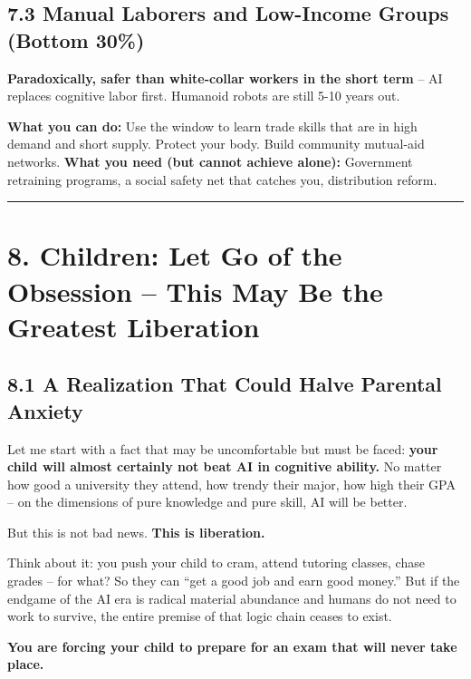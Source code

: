 \subsection{7.3 Manual Laborers and Low-Income Groups (Bottom
30\%)}\label{manual-laborers-and-low-income-groups-bottom-30}

\textbf{Paradoxically, safer than white-collar workers in the short
term} -- AI replaces cognitive labor first. Humanoid robots are still
5-10 years out.

\textbf{What you can do:} Use the window to learn trade skills that are
in high demand and short supply. Protect your body. Build community
mutual-aid networks. \textbf{What you need (but cannot achieve alone):}
Government retraining programs, a social safety net that catches you,
distribution reform.

\begin{center}\rule{0.5\linewidth}{0.5pt}\end{center}

\section{8. Children: Let Go of the Obsession -- This May Be the
Greatest
Liberation}\label{children-let-go-of-the-obsession-this-may-be-the-greatest-liberation}

\subsection{8.1 A Realization That Could Halve Parental
Anxiety}\label{a-realization-that-could-halve-parental-anxiety}

Let me start with a fact that may be uncomfortable but must be faced:
\textbf{your child will almost certainly not beat AI in cognitive
ability.} No matter how good a university they attend, how trendy their
major, how high their GPA -- on the dimensions of pure knowledge and
pure skill, AI will be better.

But this is not bad news. \textbf{This is liberation.}

Think about it: you push your child to cram, attend tutoring classes,
chase grades -- for what? So they can ``get a good job and earn good
money.'' But if the endgame of the AI era is radical material abundance
and humans do not need to work to survive, the entire premise of that
logic chain ceases to exist.

\textbf{You are forcing your child to prepare for an exam that will
never take place.}


